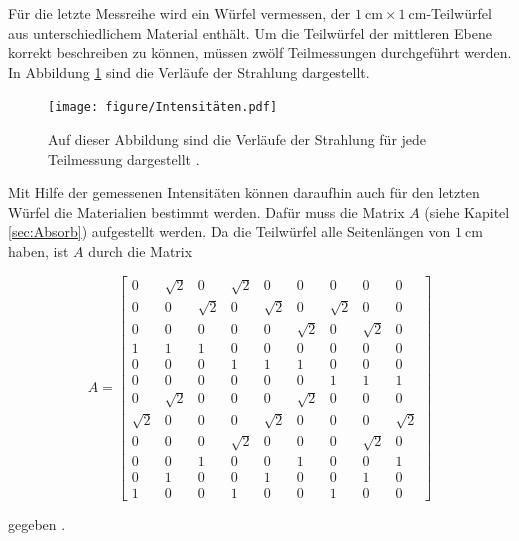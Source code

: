 Für die letzte Messreihe wird ein Würfel vermessen, der  
$\SI{1}{\centi\meter} \times \SI{1}{\centi\meter}$-Teilwürfel aus unterschiedlichem Material
enthält. Um die Teilwürfel der mittleren Ebene korrekt beschreiben zu können, müssen 
zwölf Teilmessungen durchgeführt werden.
In Abbildung \ref{abb2} sind die Verläufe der Strahlung dargestellt.

\begin{figure}
	\centering
	\texttt{[image: figure/Intensitäten.pdf]}
	\caption{Auf dieser Abbildung sind die Verläufe der Strahlung für jede Teilmessung 
	dargestellt \cite{1}.}
	\label{abb2}
\end{figure}

Mit Hilfe der gemessenen Intensitäten können daraufhin auch für den letzten Würfel die 
Materialien bestimmt werden. Dafür muss die Matrix $A$ (siehe Kapitel \ref{sec:Absorb}) 
aufgestellt werden. Da die Teilwürfel alle Seitenlängen von 
$\SI{1}{\centi\meter}$ haben, ist $A$ durch die Matrix 

\begin{equation}
	A = 	 
	\begin{bmatrix}
		0 		 & \sqrt{2}  & 0 		& \sqrt{2} & 0 		  & 0 		 & 0 		& 0 	   & 0\\
		0 		 & 0 		 & \sqrt{2} & 0 	   & \sqrt{2} & 0 		 & \sqrt{2} & 0 	   & 0   \\
		0 		 & 0 		 & 0 		& 0 	   & 0 		  & \sqrt{2} & 0 		& \sqrt{2} & 0 \\
		1 		 & 1 		 & 1 		& 0 	   & 0 		  & 0        & 0 		& 0 	   & 0  \\
		0 		 & 0 		 & 0 		& 1 	   & 1		  & 1		 & 0		& 0		   & 0  \\
		0 		 & 0 		 & 0 		& 0		   & 0		  & 0		 & 1		& 1		   & 1  \\
		0 		 & \sqrt{2}  & 0 		& 0		   & 0		  & \sqrt{2} & 0		& 0		   & 0 \\
		\sqrt{2} & 0 		 & 0 		& 0		   & \sqrt{2} & 0		 & 0		& 0		   & \sqrt{2} \\
		0 		 & 0 		 & 0 		& \sqrt{2} & 0		  & 0		 & 0		& \sqrt{2} & 0  \\ 
		0 		 & 0 		 & 1 		& 0		   & 0		  & 1		 & 0		& 0		   & 1\\
		0 		 & 1 		 & 0 		& 0		   & 1		  & 0		 & 0		& 1		   & 0  \\
		1 		 & 0 		 & 0 		& 1		   & 0		  & 0		 & 1		& 0		   & 0  
	\end{bmatrix}
\end{equation}

gegeben \cite{sample}.
\newpage